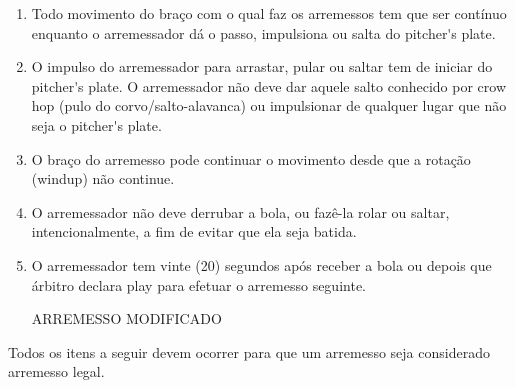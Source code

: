 \begin{enumerate}[label=(\alph*)]
	\item Todo movimento do braço com o qual faz os arremessos tem que ser  contínuo enquanto o arremessador dá o passo, impulsiona ou salta do  \gls{pitcher's plate}.
	\item   O impulso do arremessador para arrastar, pular ou saltar tem de iniciar do \gls{pitcher's plate}. O arremessador não deve dar aquele salto conhecido por \gls{crow hop} (pulo do corvo/salto-alavanca) ou impulsionar de qualquer lugar que não seja o \gls{pitcher's plate}.
	\item O braço do arremesso pode continuar o movimento desde que a rotação (\gls{windup}) não continue.
	\item   O arremessador não deve derrubar a bola, ou fazê-la rolar ou saltar, intencionalmente, a fim de evitar que ela seja batida.
	\item  O arremessador tem vinte (20) segundos após receber a bola ou depois que	 árbitro declara \gls{play} para efetuar o arremesso seguinte.

	 ARREMESSO MODIFICADO

\end{enumerate}

Todos os itens a seguir devem ocorrer para que um arremesso seja considerado arremesso legal.

